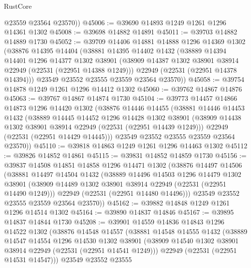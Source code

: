 \begin{lexlean}{RustCore}
\begin{coremodule}
        @23559
        @23564
        @23570))
@45006 := @39690 @14893 @1249 @1261 @1296 @14361 @1302
@45008 := @39698 @14882 @14891
@45011 := @39703 @14882 @14889 @1730
@45052 := @39709
    @14406
    @14881
    @14888
    @1296
    @14369
    @1302
    (@38876
      @14395
      @14404
      (@38881
        @14395
        @14402
        @1432
        (@38889
          @14394
          @14401
          @1296
          @14377
          @1302
          @38901
          (@38909 @14387 @1302 @38901 @38914 @22949 (@22531 (@22951 @14388 @1249)))
          @22949
          (@22531 (@22951 @14378 @14394)))
        @23549
        @23552
        @23555
        @23559
        @23564
        @23570))
@45058 := @39754 @14878 @1249 @1261 @1296 @14412 @1302
@45060 := @39762 @14867 @14876
@45063 := @39767 @14867 @14874 @1730
@45104 := @39773
    @14457
    @14866
    @14873
    @1296
    @14420
    @1302
    (@38876
      @14446
      @14455
      (@38881
        @14446
        @14453
        @1432
        (@38889
          @14445
          @14452
          @1296
          @14428
          @1302
          @38901
          (@38909 @14438 @1302 @38901 @38914 @22949 (@22531 (@22951 @14439 @1249)))
          @22949
          (@22531 (@22951 @14429 @14445)))
        @23549
        @23552
        @23555
        @23559
        @23564
        @23570))
@45110 := @39818 @14863 @1249 @1261 @1296 @14463 @1302
@45112 := @39826 @14852 @14861
@45115 := @39831 @14852 @14859 @1730
@45156 := @39837
    @14508
    @14851
    @14858
    @1296
    @14471
    @1302
    (@38876
      @14497
      @14506
      (@38881
        @14497
        @14504
        @1432
        (@38889
          @14496
          @14503
          @1296
          @14479
          @1302
          @38901
          (@38909 @14489 @1302 @38901 @38914 @22949 (@22531 (@22951 @14490 @1249)))
          @22949
          (@22531 (@22951 @14480 @14496)))
        @23549
        @23552
        @23555
        @23559
        @23564
        @23570))
@45162 := @39882 @14848 @1249 @1261 @1296 @14514 @1302
@45164 := @39890 @14837 @14846
@45167 := @39895 @14837 @14844 @1730
@45208 := @39901
    @14559
    @14836
    @14843
    @1296
    @14522
    @1302
    (@38876
      @14548
      @14557
      (@38881
        @14548
        @14555
        @1432
        (@38889
          @14547
          @14554
          @1296
          @14530
          @1302
          @38901
          (@38909 @14540 @1302 @38901 @38914 @22949 (@22531 (@22951 @14541 @1249)))
          @22949
          (@22531 (@22951 @14531 @14547)))
        @23549
        @23552
        @23555

\end{coremodule}
\end{lexlean}
